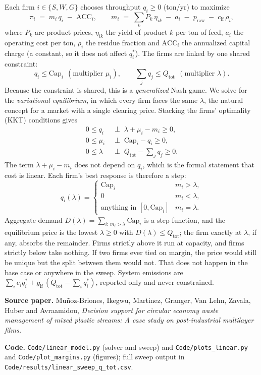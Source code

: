 \documentclass[11pt]{article}
\begin{document}
Each firm $i\in\{S,W,G\}$ chooses throughput $q_i\ge 0$ (ton/yr) to maximize
\[
\pi_i \;=\; m_i\,q_i \;-\; \mathrm{ACC}_i,
\qquad
m_i \;=\; \sum_k P_k\,\eta_{ik} \;-\; a_i \;-\; p_{\mathrm{raw}} \;-\; c_{\mathrm{lf}}\,\rho_i ,
\]
where $P_k$ are product prices, $\eta_{ik}$ the yield of product $k$ per ton of
feed, $a_i$ the operating cost per ton, $\rho_i$ the residue fraction and
$\mathrm{ACC}_i$ the annualized capital charge (a constant, so it does not affect
$q_i^\ast$). The firms are linked by one shared constraint:
\[
q_i \le \mathrm{Cap}_i \ \ (\text{multiplier } \mu_i),
\qquad
\sum_{j} q_j \le Q_{\mathrm{tot}} \ \ (\text{multiplier } \lambda).
\]
Because the constraint is shared, this is a \emph{generalized} Nash game. We solve for the
\emph{variational equilibrium}, in which every firm faces the same $\lambda$,
the natural concept for a market with a single clearing price. Stacking the
firms' optimality (KKT) conditions gives
\begin{align*}
0 \le q_i &\;\perp\; \lambda+\mu_i-m_i \ge 0, \\
0 \le \mu_i &\;\perp\; \mathrm{Cap}_i-q_i \ge 0, \\
0 \le \lambda &\;\perp\; Q_{\mathrm{tot}}-\textstyle\sum_j q_j \ge 0 .
\end{align*}
The term $\lambda+\mu_i-m_i$ does not depend on $q_i$, which is the formal
statement that cost is linear. Each firm's best response is therefore a step:
\[
q_i(\lambda)=
\begin{cases}
\mathrm{Cap}_i & m_i>\lambda,\\
0 & m_i<\lambda,\\
\text{anything in }[0,\mathrm{Cap}_i] & m_i=\lambda .
\end{cases}
\]
Aggregate demand $D(\lambda)=\sum_{i:\,m_i>\lambda}\mathrm{Cap}_i$ is a step function, and the
equilibrium price is the lowest $\lambda\ge 0$ with $D(\lambda)\le Q_{\mathrm{tot}}$;
the firm exactly at $\lambda$, if any, absorbs the remainder. Firms strictly above
it run at capacity, and firms strictly below take nothing. If two firms ever tied
on margin, the price would still be unique but the split between them would not.
That does not happen in the base case or anywhere in the sweep.
System emissions are $\sum_i e_i q_i^\ast + g_{\mathrm{lf}}\,(Q_{\mathrm{tot}}-\sum_i q_i^\ast)$,
reported only and never constrained.

\medskip
\noindent\textbf{Source paper.} Mu\~{n}oz-Briones, Ikegwu, Martinez, Granger, Van Lehn,
Zavala, Huber and Avraamidou, \emph{Decision support for circular economy waste
management of mixed plastic streams: A case study on post-industrial multilayer
films.}

\noindent\textbf{Code.} \texttt{Code/linear\_model.py} (solver and sweep) and
\texttt{Code/plots\_linear.py} and \texttt{Code/plot\_margins.py} (figures); full sweep output in
\texttt{Code/results/linear\_sweep\_q\_tot.csv}.
\end{document}
